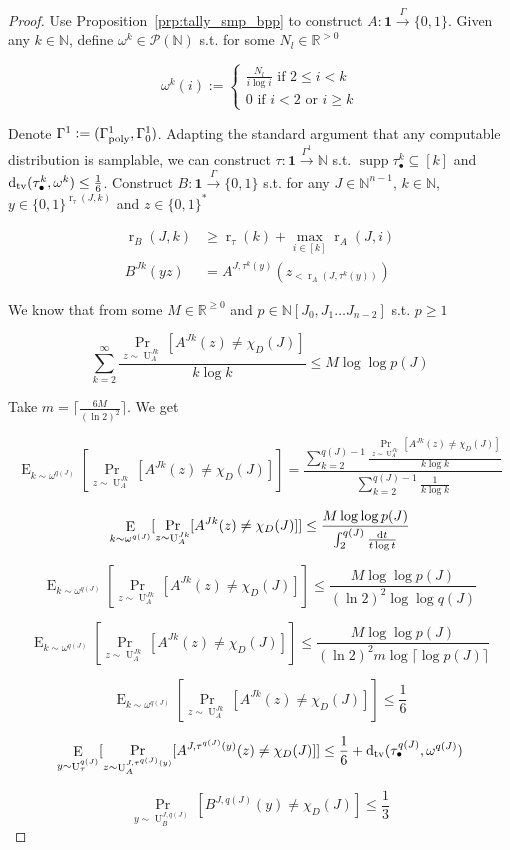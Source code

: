 \documentclass{article}
\numberwithin{equation}{section}
\theoremstyle{definition}
\theoremstyle{plain}
\newcommand{\Bool}{\{0,1\}}
\newcommand{\Words}{{\Bool^*}}
\DeclareMathOperator{\Supp}{supp}
\DeclareMathOperator{\Prb}{Pr}
\DeclareMathOperator{\E}{E}
\DeclareMathOperator{\R}{r}
\DeclareMathOperator{\Un}{U}
\newcommand{\Dtv}{\operatorname{d}_{\textnormal{tv}}}
\newcommand{\Nats}{\mathbb{N}}
\newcommand{\Reals}{\mathbb{R}}
\newcommand{\NatPolyJ}{\Nats[J_0, J_1 \ldots J_{n-2}]}
\newcommand{\Ceil}[1]{\lceil #1 \rceil}
\newcommand{\GammaPoly}{\Gamma_{\textnormal{poly}}}
\newcommand{\Scheme}{\xrightarrow{\Gamma}}
\begin{document}
\begin{proof}

Use Proposition~\ref{prp:tally_smp_bpp} to construct ${A: \bm{1} \Scheme \Bool}$. Given any ${k \in \Nats}$, define ${\omega^k \in \mathcal{P}(\Nats)}$ s.t. for some ${N_l \in \Reals^{>0}}$

\[\omega^k(i):=\begin{cases}\frac{N_l}{i \log i} \text{ if } 2 \leq i < k\\0 \text{ if } i < 2 \text { or } i \geq k\end{cases}\]

Denote ${\Gamma^1:=(\GammaPoly^1,\Gamma_0^1)}$. Adapting the standard argument that any computable distribution is samplable, we can construct ${\tau: \bm{1} \xrightarrow{\Gamma^1} \Nats}$ s.t. ${\Supp \tau_\bullet^{k} \subseteq [k]}$ and ${\Dtv(\tau_\bullet^{k}, \omega^k) \leq \frac{1}{6}}$. Construct ${B: \bm{1} \Scheme \Bool}$ s.t. for any ${J \in \Nats^{n-1}}$, ${k \in \Nats}$, ${y \in \Bool^{\R_\tau(J,k)}}$ and ${z \in \Words}$

\begin{align*}
\R_B(J,k) &\geq \R_\tau(k) + \max_{i \in [k]} \R_A(J,i) \\
B^{Jk}(y z) &= A^{J,\tau^{k}(y)}(z_{<\R_A(J,\tau^{k}(y))}) 
\end{align*}

We know that from some ${M \in \Reals^{\geq 0}}$ and ${p \in \NatPolyJ}$ s.t. ${p \geq 1}$

\[\sum_{k=2}^\infty \frac{\Prb_{z \sim \Un_A^{Jk}}[A^{Jk}(z) \neq \chi_D(J)]}{k \log k} \leq M \log \log p(J)\]

Take ${m = \Ceil{\frac{6M}{(\ln 2)^2}}}$. We get

\[\E_{k \sim \omega^{q(J)}}[\Prb_{z \sim \Un_A^{Jk}}[A^{Jk}(z) \neq \chi_D(J)]]=\frac{\sum_{k=2}^{q(J)-1} \frac{\Prb_{z \sim \Un_A^{Jk}}[A^{Jk}(z) \neq \chi_D(J)]}{k \log k}}{\sum_{k=2}^{q(J)-1} \frac{1}{k \log k}}\]

\[\E_{k \sim \omega^{q(J)}}[\Prb_{z \sim \Un_A^{Jk}}[A^{Jk}(z) \neq \chi_D(J)]] \leq \frac{M \log \log p(J)}{\int_2^{q(J)} \frac{\dif t}{t \log t}}\]

\[\E_{k \sim \omega^{q(J)}}[\Prb_{z \sim \Un_A^{Jk}}[A^{Jk}(z) \neq \chi_D(J)]] \leq \frac{M \log \log p(J)}{(\ln 2)^2 \log \log q(J)}\]

\[\E_{k \sim \omega^{q(J)}}[\Prb_{z \sim \Un_A^{Jk}}[A^{Jk}(z) \neq \chi_D(J)]] \leq \frac{M \log \log p(J)}{(\ln 2)^2 m \log \Ceil{\log p(J)}}\]

\[\E_{k \sim \omega^{q(J)}}[\Prb_{z \sim \Un_A^{Jk}}[A^{Jk}(z) \neq \chi_D(J)]] \leq \frac{1}{6}\]

\[\E_{y \sim \Un_\tau^{q(J)}}[\Prb_{z \sim \Un_A^{J,\tau^{q(J)}(y)}}[A^{J,\tau^{q(J)}(y)}(z) \neq \chi_D(J)]] \leq \frac{1}{6}+\Dtv(\tau_\bullet^{q(J)},\omega^{q(J)})\]

\[\Prb_{y \sim \Un_B^{J,q(J)}}[B^{J,q(J)}(y) \ne \chi_D(J)] \leq \frac{1}{3}\]
%
\end{proof}
\end{document}
